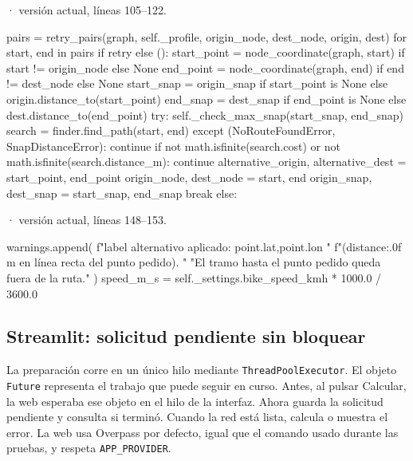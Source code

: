 \documentclass[11pt,a4paper]{article}
\begin{document}
\smallskip
{\footnotesize\texttt{} · versión actual, líneas 105--122.}\par
\begin{Codigo}[firstnumber=105]
            pairs = retry_pairs(graph, self._profile, origin_node, dest_node, origin, dest)
            for start, end in pairs if retry else ():
                start_point = node_coordinate(graph, start) if start != origin_node else None
                end_point = node_coordinate(graph, end) if end != dest_node else None
                start_snap = origin_snap if start_point is None else origin.distance_to(start_point)
                end_snap = dest_snap if end_point is None else dest.distance_to(end_point)
                try:
                    self._check_max_snap(start_snap, end_snap)
                    search = finder.find_path(start, end)
                except (NoRouteFoundError, SnapDistanceError):
                    continue
                if not math.isfinite(search.cost) or not math.isfinite(search.distance_m):
                    continue
                alternative_origin, alternative_dest = start_point, end_point
                origin_node, dest_node = start, end
                origin_snap, dest_snap = start_snap, end_snap
                break
            else:
\end{Codigo}

\smallskip
{\footnotesize\texttt{} · versión actual, líneas 148--153.}\par
\begin{Codigo}[firstnumber=148]
                warnings.append(
                    f"{label} alternativo aplicado: {point.lat},{point.lon} "
                    f"({distance:.0f} m en línea recta del punto pedido). "
                    "El tramo hasta el punto pedido queda fuera de la ruta."
                )
        speed_m_s = self._settings.bike_speed_kmh * 1000.0 / 3600.0
\end{Codigo}

\subsection{Streamlit: solicitud pendiente sin bloquear}
La preparación corre en un único hilo mediante \texttt{ThreadPoolExecutor}. El objeto \texttt{Future} representa el trabajo que puede seguir en curso. Antes, al pulsar Calcular, la web esperaba ese objeto en el hilo de la interfaz. Ahora guarda la solicitud pendiente y consulta si terminó. Cuando la red está lista, calcula o muestra el error. La web usa Overpass por defecto, igual que el comando usado durante las pruebas, y respeta \texttt{APP\_PROVIDER}.
\end{document}
